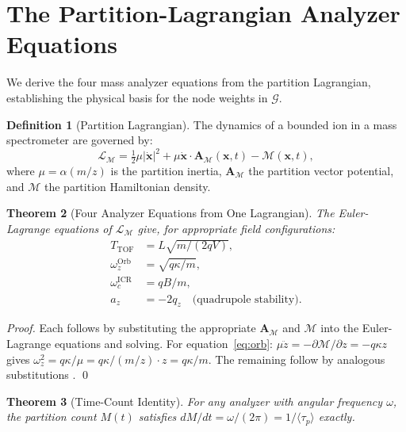 \documentclass[twocolumn,10pt,a4paper]{article}
\theoremstyle{thmstyle}
\newtheorem{theorem}{Theorem}[section]
\theoremstyle{definition}
\newtheorem{definition}[theorem]{Definition}
\theoremstyle{remark}
\newcommand{\LM}{\mathcal{L}_{\mathcal{M}}}
\newcommand{\AM}{\mathbf{A}_{\mathcal{M}}}
\newcommand{\Mop}{\mathcal{M}}
\newcommand{\tp}{\langle\tau_{p}\rangle}
\newcommand{\calG}{\mathcal{G}}
\newcommand{\Mcyc}{M}
\begin{document}
\section{The Partition-Lagrangian Analyzer Equations}
\label{sec:lagrangian}

We derive the four mass analyzer equations from the partition Lagrangian,
establishing the physical basis for the node weights in $\calG$.

\begin{definition}[Partition Lagrangian]
The dynamics of a bounded ion in a mass spectrometer are governed by:
\begin{equation}
\LM = \tfrac{1}{2}\mu|\dot{\mathbf{x}}|^2
+ \mu\dot{\mathbf{x}}\cdot\AM(\mathbf{x},t) - \Mop(\mathbf{x},t),
\label{eq:lagrangian}
\end{equation}
where $\mu = \alpha(m/z)$ is the partition inertia, $\AM$ the partition
vector potential, and $\Mop$ the partition Hamiltonian density.
\end{definition}

\begin{theorem}[Four Analyzer Equations from One Lagrangian]
\label{thm:analyzers}
The Euler-Lagrange equations of $\LM$ give, for appropriate field
configurations:
\begin{align}
T_\mathrm{TOF}      &= L\sqrt{m/(2qV)},
\label{eq:tof}\\
\omega_z^\mathrm{Orb} &= \sqrt{q\kappa/m},
\label{eq:orb}\\
\omega_c^\mathrm{ICR} &= qB/m,
\label{eq:icr}\\
a_z                 &= -2q_z \quad \text{(quadrupole stability)}.
\label{eq:quad}
\end{align}
\end{theorem}

\begin{proof}
Each follows by substituting the appropriate $\AM$ and $\Mop$ into the
Euler-Lagrange equations and solving. For equation~\eqref{eq:orb}:
$\mu\ddot{z} = -\partial\Mop/\partial z = -q\kappa z$ gives
$\omega_z^2 = q\kappa/\mu = q\kappa/(m/z) \cdot z = q\kappa/m$.
The remaining follow by analogous substitutions \citep{makarov2000,
marshall1998, paul1990, wiley1955}. \qed
\end{proof}

\begin{theorem}[Time-Count Identity]
\label{thm:time-count}
For any analyzer with angular frequency $\omega$, the partition count
$\Mcyc(t)$ satisfies $d\Mcyc/dt = \omega/(2\pi) = 1/\tp$ exactly.
\end{theorem}
\end{document}
